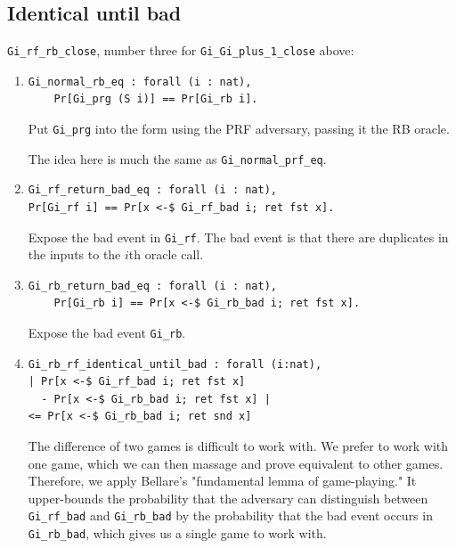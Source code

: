 \documentclass[12pt,lot, lof]{puthesis}
\newcommand{\li} {\lstinline}
\begin{document}
{\subsection{Identical until bad}

\lstinline|Gi_rf_rb_close|, number three for \lstinline|Gi_Gi_plus_1_close| above:
\begin{enumerate}
\par
\item \begin{lstlisting}
Gi_normal_rb_eq : forall (i : nat),
    Pr[Gi_prg (S i)] == Pr[Gi_rb i].
    \end{lstlisting} 
    
Put \li|Gi_prg| into the form using the PRF adversary, passing it the RB oracle.

The idea here is much the same as \li|Gi_normal_prf_eq|.

\par
\item \begin{lstlisting} 
Gi_rf_return_bad_eq : forall (i : nat),
Pr[Gi_rf i] == Pr[x <-$ Gi_rf_bad i; ret fst x].
  \end{lstlisting}
  
  Expose the bad event in \li|Gi_rf|. The bad event is that there are duplicates in the inputs to the $i$th oracle call.

\par
\item \begin{lstlisting}
Gi_rb_return_bad_eq : forall (i : nat),
    Pr[Gi_rb i] == Pr[x <-$ Gi_rb_bad i; ret fst x].
\end{lstlisting}

Expose the bad event \li|Gi_rb|.

\par
\item \begin{lstlisting}
Gi_rb_rf_identical_until_bad : forall (i:nat), 
| Pr[x <-$ Gi_rf_bad i; ret fst x] 
  - Pr[x <-$ Gi_rb_bad i; ret fst x] | 
<= Pr[x <-$ Gi_rb_bad i; ret snd x]
\end{lstlisting}                                

The difference of two games is difficult to work with. We prefer to work with one game, which we can then massage and prove equivalent to other games. Therefore, we apply Bellare's "fundamental lemma of game-playing." It upper-bounds the probability that the adversary can distinguish between \li|Gi_rf_bad| and \li|Gi_rb_bad| by the probability that the bad event occurs in \li|Gi_rb_bad|, which gives us a single game to work with.


\end{enumerate}}
\end{document}
